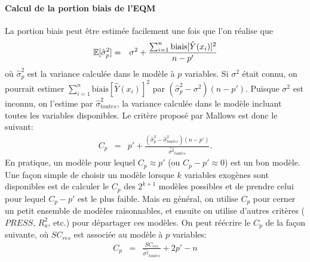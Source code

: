 \paragraph{Calcul de la portion biais de l'EQM}
La portion biais peut être estimée facilement une fois que l'on réalise que
\begin{eqnarray*}
  \mathbb{E}[\hat\sigma_p^2] &=& \sigma^2+\frac{\sum_{i=1}^n \mbox{biais}[\hat{Y}(x_i)]^2}{n-p'}
\end{eqnarray*}
où $\hat\sigma_p^2$ est la variance calculée dans le modèle à $p$ variables. Si $\sigma^2$ était connu, on pourrait estimer $\sum_{i=1}^n \mbox{biais}[\hat{Y}(x_i)]^2$ par $(\hat\sigma_p^2-\sigma^2)(n-p')$. Puisque $\sigma^2$ est inconnu, on l'estime par $\hat{\sigma}^2_{toutes}$, la variance calculée dans le modèle incluant toutes les variables disponibles. Le critère proposé par Mallows est donc le suivant:
\begin{eqnarray*}
  C_p &=& p' + \frac{(\hat\sigma_p^2-\hat{\sigma}^2_{toutes})(n-p')}{\hat{\sigma^2}_{toutes}}.
\end{eqnarray*}
En pratique, un modèle pour lequel $C_p\approx p'$ (ou
$C_p-p'\approx0$) est un bon modèle. Une fa\c{c}on simple de
choisir un modèle lorsque $k$ variables exogènes sont
disponibles est de calculer le $C_p$ des $2^{k+1}$ modèles
possibles et de prendre celui pour lequel $C_p-p'$ est le plus
faible. Mais en général, on utilise $C_p$ pour cerner un petit
ensemble de modèles raisonnables, et ensuite on utilise d'autres
critères ($PRESS$, $R^2_{a}$, etc.) pour départager ces
modèles. On peut réécrire le $C_p$ de la façon suivante, où $SC_{res}$ est associée au modèle à $p$ variables:
\begin{eqnarray*}
  C_p &=& \frac{SC_{res}}{\hat{\sigma^2}_{toutes}}+2p'-n
\end{eqnarray*}


%


